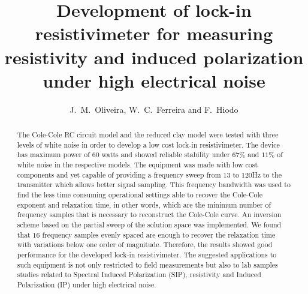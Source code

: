 \documentclass{vie16}
\begin{document}
\title{Development of lock-in resistivimeter for measuring
resistivity and induced polarization under high electrical noise}
\author{J.~M.~Oliveira, W.~C.~Ferreira and F.~Hiodo}
\maketitle


\begin{abstract}

	The Cole-Cole RC circuit model and the reduced clay model were
	tested with three levels of white noise in order to develop a low
	cost lock-in resistivimeter. The device has maximum power of 60
	watts and showed reliable stability under $67 \%$ and $11 \%$ of
	white noise in the respective models. The equipment was made with
	low cost components and yet capable of providing a frequency sweep
	from $13$ to $120$Hz to the transmitter which allows better signal
	sampling. This frequency bandwidth was used to find the less time
	consuming operational settings able to recover the Cole-Cole
	exponent and relaxation time, in other words, which are the minimum
	number of frequency samples that is necessary to reconstruct the
	Cole-Cole curve. An inversion scheme based on the partial sweep of
	the solution space was implemented. We found that $16$
	frequency samples evenly spaced are enough to recover the relaxation
	time with variations below one order of magnitude. Therefore, the
	results showed good performance for the developed lock-in
	resistivimeter. The suggested applications to such equipment is not
	only restricted to field measurements but also to lab samples
	studies related to Spectral Induced Polarization (SIP), resistivity
	and Induced Polarization (IP) under high electrical noise.  
\end{abstract}	
		

\newpage
\end{document}
